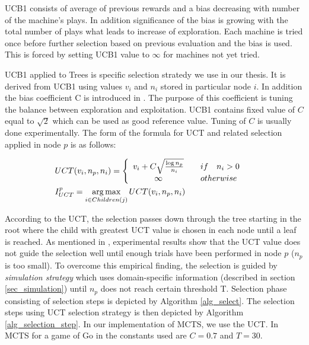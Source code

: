 UCB1 consists of average of previous rewards and a bias decreasing with number of the
machine's plays. In addition significance of the bias is growing with the total number of plays
what
leads to increase of exploration. Each machine is tried once before further selection based on
previous evaluation and the bias is used. This is forced by setting UCB1 value to $\infty$ for
machines not yet tried.

UCB1 applied to Trees \cite{Kocsis2006} is specific selection stratedy we use in our thesis. It 
is derived from UCB1 using values $v_i$ and $n_i$ stored in
particular node $i$. In addition the bias coefficient C is introduced in \cite{Chaslot2008}.
The purpose of this coefficient is tuning the balance between exploration and exploitation.
UCB1 contains fixed value of $C$ equal to $\sqrt{2}$ which can be used as good reference value.
Tuning of $C$ is usually done 
experimentally. The form of the formula for UCT and related selection applied in node $p$ is as
follows:

\begin{align}
    &\begin{aligned}
UCT(v_i,n_p,n_i) &= \left\{
        \begin{array}{c@{\quad\quad}l}
            v_i + C \sqrt{{\log{n_p}} \over n_i} & if \quad n_i > 0 \\
            \infty & otherwise \\
        \end{array}
    \right.
    \end{aligned}\\
    &\begin{aligned}
I_{UCT}^p &= \argmax\limits_{i \in Children(j)} UCT(v_i, n_p, n_i)
    \end{aligned}
\end{align}



According to the UCT, the selection passes down through the tree starting in the
root where the child with greatest UCT value is chosen in each node until a leaf is reached.
As mentioned in \cite{Chaslot2008}, experimental results show that the UCT value does not 
guide the selection well until
enough trials have been performed in node $p$ ($n_p$ is too small). To overcome this empirical
finding, the selection is guided by \emph{simulation strategy} which uses domain-specific
information (described in section
\ref{sec_simulation}) until $n_p$ does not reach certain threshold T. Selection phase
consisting of selection steps is
depicted by Algorithm \ref{alg_select}. The selection steps using UCT selection strategy is 
then depicted by Algorithm
\ref{alg_selection_step}. In our implementation of MCTS, we use the UCT. In MCTS for a game 
of Go in \cite{Chaslot2008} the constants used are $C= 0.7$ and $T=30$.

